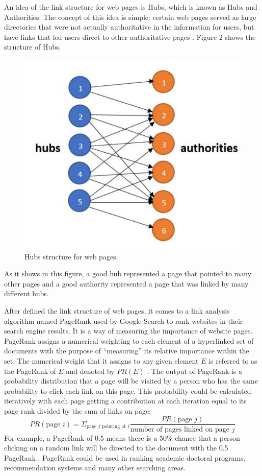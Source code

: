 \documentclass[sigconf]{acmart}
\begin{document}
An idea of the link structure for web pages is Hubs, which is known as Hubs and Authorities. The concept of this idea is simple: certain web pages served as large directories that were not actually authoritative in the information for users, but have links that led users direct to other authoritative pages \cite{editor09}. Figure 2 shows the structure of Hubs.
\begin{figure}
\includegraphics[width=0.30\columnwidth]{images/Hubs_structure}
\caption{Hubs structure for web pages.}
\end{figure}
As it shows in this figure, a good hub represented a page that pointed to many other pages and a good authority represented a page that was linked by many different hubs.

After defined the link structure of web pages, it comes to a link analysis algorithm named PageRank used by Google Search to rank websites in their search engine results. It is a way of measuring the importance of website pages. PageRank assigns a numerical weighting to each element of a hyperlinked set of documents with the purpose of ``measuring'' its relative importance within the set. The numerical weight that it assigns to any given element $E$ is referred to as the PageRank of $E$ and denoted by $PR(E)$ \cite{editor10}. The output of PageRank is a probability distribution that a page will be visited by a person who has the same probability to click each link on this page. This probability could be calculated iteratively with each page getting a contribution at each iteration equal to its page rank divided by the sum of links on page:
\[PR(\text{page } i)=\Sigma_{\text{page } j \text{ pointing at } i}\dfrac{PR(\text{page } j)}{\text{number of pages linked on page } j}\]
For example, a PageRank of 0.5 means there is a 50\% chance that a person clicking on a random link will be directed to the document with the 0.5 PageRank \cite{editor10}. PageRank could be used in ranking academic doctoral programs, recommendation systems and many other searching areas.
    
\end{document}
